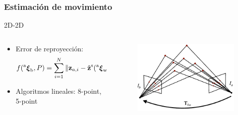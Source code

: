 \begin{frame}
	\frametitle{Estimación de movimiento}
	\footnotesize
	
	2D-2D
    \begin{columns}
	\begin{column}{0.7\textwidth}
		\begin{itemize}
		\item Error de reproyección:
		\[
		f(\prescript{\mathrm{a}}{}{{\boldsymbol{\mathbf{\xi}}}_\mathrm{b}}, P)= \sum_{i=1}^{N} \Vert \boldsymbol{\mathbf{z}}_{a,i} - \hat{\boldsymbol{\mathbf{z}}}^{\mathrm{s}}(\prescript{\mathrm{a}}{}{{\boldsymbol{\mathbf{\xi}}}_\mathrm{\mathrm{w}}},\prescript{\mathrm{\mathrm{w}}}{}{\boldsymbol{\mathbf{p}}}_{i}) \Vert^{2} + \Vert \boldsymbol{\mathbf{z}}_{b,i} - \hat{\boldsymbol{\mathbf{z}}}^{\mathrm{s}}({\prescript{\mathrm{a}}{}{{\boldsymbol{\mathbf{\xi}}}_\mathrm{b}}}^{-1}\prescript{\mathrm{a}}{}{{\boldsymbol{\mathbf{\xi}}}_\mathrm{\mathrm{w}}},\prescript{\mathrm{\mathrm{w}}}{}{\boldsymbol{\mathbf{p}}}_{i}) \Vert^{2}
		\]
		\item Algoritmos lineales: 8-point, 5-point
		\end{itemize}
	\end{column}
	\begin{column}{0.3\textwidth}
	    \begin{figure}
			\includegraphics[width=0.5\columnwidth]{./images/localization_2d_2d.pdf}
		\end{figure}
	\end{column}
	\end{columns}


\end{frame}
